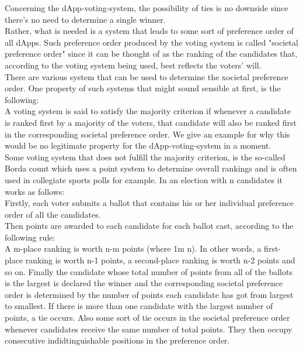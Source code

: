 Concerning the dApp-voting-system, the possibility of ties is no downside since there's no need to determine a single winner.\\ %
Rather, what is needed is a system that leads to some sort of preference order of all dApps. Such preference order produced by the voting system is called "societal preference order" since it can be thought of as the ranking of the candidates that, according to the voting system being used, best reflects the voters' will. \\
There are various system that can be used to determine the xocietal preference order. One property of such systems that might sound sensible at first, is the following: \\
A voting system is said to satisfy the majority criterion if whenever a candidate is ranked first by a majority of the voters, that candidate will also be ranked first in the corresponding societal preference order. We give an example for why this would be no legitimate property for the dApp-voting-system in a moment.\\
Some voting system that does not fulfill the majority criterion, is the so-called Borda count which uses a point system to determine overall rankings and is often used in collegiate sports polls for example. In an election with n candidates it works as follows: \\
Firstly, each voter submits a ballot that contains his or her individual preference order of all the candidates. \\
Then points are awarded to each candidate for each ballot cast, according to the following rule: \\
A m-place ranking is worth n-m points (where 1\leq m \leq n). In other words, a first-place ranking is worth n-1 points, a second-place ranking is worth n-2 points and so on. 
Finally the candidate whose total number of points from all of the ballots is the largest is declared the winner and the corresponding societal preference order is determined by the number of points each candidate has got from largest to smallest. If there is more than one candidate with the largest number of points, a tie occurs. Also some sort of tie occurs in the societal preference order whenever candidates receive the same number of total points. They then occupy consecutive indidtinguishable positions in the preference order. 







